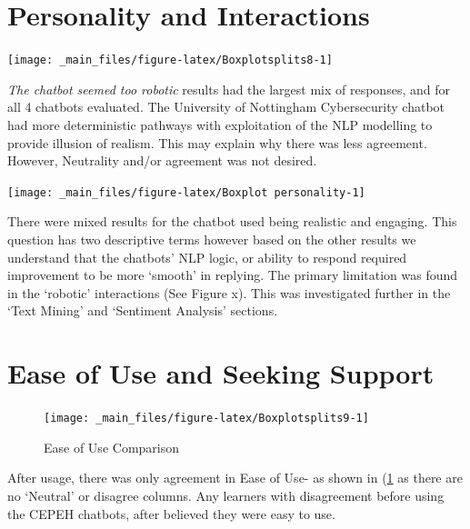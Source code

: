 \documentclass[a4paper, nobind]{templates/ociamthesis}
\begin{document}
\hypertarget{personality-and-interactions}{%
\section{Personality and Interactions}\label{personality-and-interactions}}

\begin{center}\texttt{[image: \_main\_files/figure-latex/Boxplotsplits8-1]} \end{center}

\emph{The chatbot seemed too robotic} results had the largest mix of
responses, and for all 4 chatbots evaluated. The University of
Nottingham Cybersecurity chatbot had more deterministic pathways with
exploitation of the NLP modelling to provide illusion of realism. This
may explain why there was less agreement. However, Neutrality and/or
agreement was not desired.

\begin{center}\texttt{[image: \_main\_files/figure-latex/Boxplot personality-1]} \end{center}

There were mixed results for the chatbot used being realistic and engaging. This question has two descriptive terms however based on the other results we understand that the chatbots' NLP logic, or ability to respond required improvement to be more `smooth' in replying. The primary limitation was found in the `robotic' interactions (See Figure x). This was
investigated further in the `Text Mining' and `Sentiment Analysis' sections.

\hypertarget{ease-of-use-and-seeking-support}{%
\section{Ease of Use and Seeking Support}\label{ease-of-use-and-seeking-support}}

\begin{figure}

{\centering \texttt{[image: \_main\_files/figure-latex/Boxplotsplits9-1]} 

}

\caption{Ease of Use Comparison}\label{fig:Boxplotsplits9}
\end{figure}

After usage, there was only agreement in Ease of Use- as shown in
(\ref{fig:Boxplotsplits9} as there are no `Neutral' or disagree
columns. Any learners with disagreement before using the CEPEH chatbots,
after believed they were easy to use.
\end{document}

